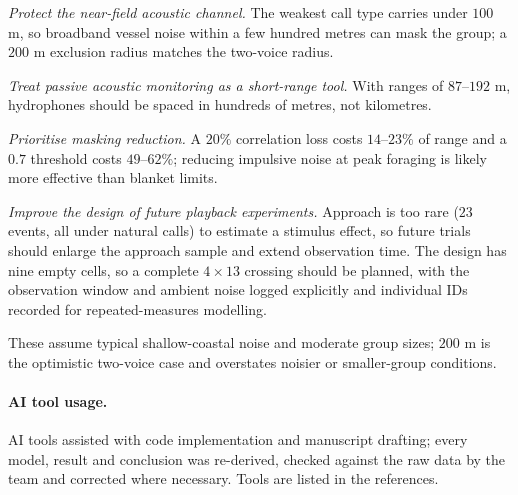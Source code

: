 \documentclass{apmcmthesis}
\begin{document}
\emph{Protect the near-field acoustic channel.} The weakest call type carries under
$100$ m, so broadband vessel noise within a few hundred metres can mask the group; a
$200$ m exclusion radius matches the two-voice radius.

\emph{Treat passive acoustic monitoring as a short-range tool.} With ranges of
$87$--$192$ m, hydrophones should be spaced in hundreds of metres, not kilometres.

\emph{Prioritise masking reduction.} A $20\%$ correlation loss costs $14$--$23\%$ of range
and a $0.7$ threshold costs $49$--$62\%$; reducing impulsive noise at peak foraging is
likely more effective than blanket limits.

\emph{Improve the design of future playback experiments.} Approach is too rare ($23$
events, all under natural calls) to estimate a stimulus effect, so future trials should
enlarge the approach sample and extend observation time. The design has nine empty cells,
so a complete $4\times13$ crossing should be planned, with the observation window and
ambient noise logged explicitly and individual IDs recorded for repeated-measures
modelling.

These assume typical shallow-coastal noise and moderate group sizes; $200$ m is the
optimistic two-voice case and overstates noisier or smaller-group conditions.
\paragraph{AI tool usage.} AI tools assisted with code implementation and manuscript
drafting; every model, result and conclusion was re-derived, checked against the raw data
by the team and corrected where necessary. Tools are listed in the references.
\end{document}
